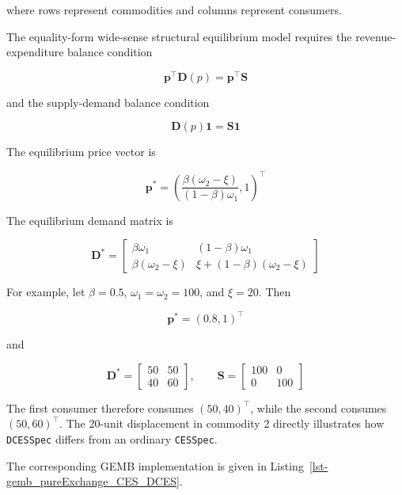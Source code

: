 \documentclass[
  letterpaper,
  DIV=11,
  numbers=noendperiod]{scrreprt}
\begin{document}
where rows represent commodities and columns represent consumers.

The equality-form wide-sense structural equilibrium model requires the
revenue-expenditure balance condition

\[
\mathbf p^\top\mathbf D(p)
=
\mathbf p^\top\mathbf S
\]

and the supply-demand balance condition

\[
\mathbf D(p)\mathbf 1
=
\mathbf S\mathbf 1
\]

The equilibrium price vector is

\[
\mathbf p^*
=
\left(
\frac{\beta(\omega_2-\xi)}
{(1-\beta)\omega_1},
1
\right)^\top
\]

The equilibrium demand matrix is

\[
\mathbf D^*
=
\begin{bmatrix}
\beta\omega_1&(1-\beta)\omega_1\\
\beta(\omega_2-\xi)&
\xi+(1-\beta)(\omega_2-\xi)
\end{bmatrix}
\]

For example, let \(\beta=0.5\), \(\omega_1=\omega_2=100\), and
\(\xi=20\). Then

\[
\mathbf p^*=(0.8,1)^\top
\]

and

\[
\mathbf D^*
=
\begin{bmatrix}
50&50\\
40&60
\end{bmatrix},
\qquad
\mathbf S
=
\begin{bmatrix}
100&0\\
0&100
\end{bmatrix}
\]

The first consumer therefore consumes \((50,40)^\top\), while the second
consumes \((50,60)^\top\). The 20-unit displacement in commodity 2
directly illustrates how \texttt{DCESSpec} differs from an ordinary
\texttt{CESSpec}.

The corresponding GEMB implementation is given in
Listing~\ref{lst-gemb_pureExchange_CES_DCES}.
\end{document}
